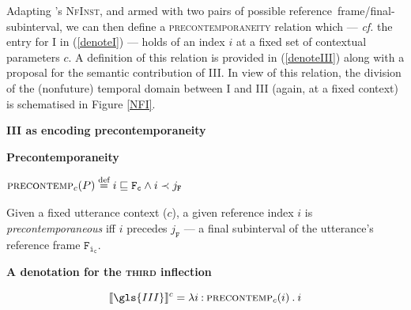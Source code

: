 Adapting \citeauthor{Condoravdi2014}'s \textsc{NfInst}, and armed with two pairs of possible reference~frame/final-subinterval, we can then define a \textsc{precontemporaneity} relation which --- \textit{cf.} the entry for \gls{I} in (\ref{denoteI}) --- holds of an index $ i $ at a fixed set of contextual parameters $ c $. A definition of this relation is provided in (\ref{denoteIII}) along with a proposal for the semantic contribution of \gls{III}. In view of this relation, the division of the (nonfuture) temporal domain between \gls{I} and \gls{III} (again, at a fixed context) is schematised in Figure \ref{NFI}.

\begin{shaded}
\pex\textbf{\gls{III} as encoding precontemporaneity}\label{denoteIII}

\a\textbf{Precontemporaneity}

$\begin{aligned}\textsc{precontemp}_{c}(P)\overset{\text{def}}{=}\iffalse\quad\&\textsc{NfInst}(P,\mathtt{F},j_{\mathtt{F}})\\\fi
	i\sqsubseteq\mathtt{F_c}\wedge i\prec j_{\mathtt{F}}\end{aligned}$


Given a fixed utterance context ($ c $), a given reference index $ i $ is \textit{precontemporaneous} iff $ i $ precedes $ j_{\mathtt{F}} $ --- a final subinterval of the utterance's reference frame $ \mathtt{F_{i_c}} $.%

\a \textbf{A denotation for the \textsc{third} inflection}

\[\denote[c]{\gls{III}}=\lambda i\mathbin{:}\textsc{precontemp}_c(i)\mathbin.i\]

\xe

\end{shaded}





